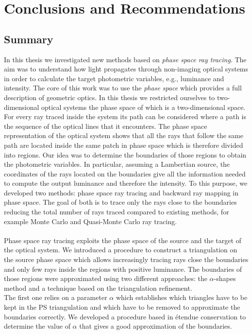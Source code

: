 \chapter{Conclusions and Recommendations}\label{chap:conclusions}
\section{Summary}
In this thesis we investigated new methods based on \textit{phase space ray tracing}. The aim was to understand how light propagates through non-imaging optical systems in order to calculate the target photometric variables, e.g., luminance and intensity. 
The core of this work was to use the \textit{phase space} which provides a full description of geometric optics. In this thesis we restricted ourselves to two-dimensional optical systems the phase space of which is a two-dimensional space. For every ray traced inside the system its path can be considered where a path is the sequence of the optical lines that it encounters. The phase space representation of the optical system shows that all the rays that follow the same path are located inside the same patch in phase space which is therefore divided into regions. Our idea was to determine the boundaries of those regions to obtain the photometric variables. In particular, assuming a Lambertian source, the coordinates of the rays located on the boundaries give all the information needed to compute the output luminance and therefore the intensity.
To this purpose, we developed two methods: phase space ray tracing and backward ray mapping in phase space. The goal of both is to trace only the rays close to the boundaries reducing the total number of rays traced compared to existing methods, for example Monte Carlo and Quasi-Monte Carlo ray tracing.
\\ \\ \indent Phase space ray tracing exploits the phase space of the source and the target of the optical system. %
We introduced a procedure to construct a triangulation on the source phase space which allows increasingly tracing rays close the boundaries and only few rays inside the regions with positive luminance. 
The boundaries of those regions were approximated using two different approaches: the $\alpha$-shapes method and a technique based on the triangulation refinement. \\ \indent 
The first one relies on a parameter $\alpha$ which establishes which triangles have to be kept in the PS triangulation and which have to be removed to approximate the boundaries correctly. We developed a procedure based in \'{e}tendue conservation to determine the value of $\alpha$ that gives a good approximation of the boundaries.
